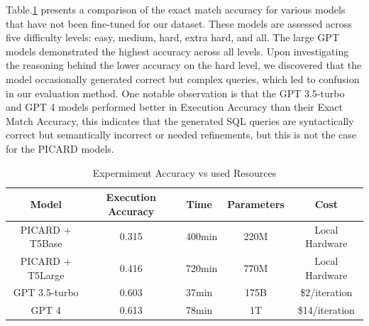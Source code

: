 Table.\ref{tab:exp-acc-vs-resources} presents a comparison of the exact match accuracy for various models that have not been fine-tuned for our dataset. These models are assessed across five difficulty levels: easy, medium, hard, extra hard, and all. The large GPT models demonstrated the highest accuracy across all levels. Upon investigating the reasoning behind the lower accuracy on the hard level, we discovered that the model occasionally generated correct but complex queries, which led to confusion in our evaluation method. One notable observation is that the GPT 3.5-turbo and GPT 4 models performed better in Execution Accuracy than their Exact Match Accuracy, this indicates that the generated SQL queries are syntactically correct but semantically incorrect or needed refinements, but this is not the case for the PICARD models.

\begin{table}[!ht]
    \centering
    \begin{tabular}{ccccc}
        \hline
        Model            & \textbf{Execution Accuracy} & \textbf{Time} & \textbf{Parameters} & \textbf{Cost}  \\ \hline
        PICARD + T5Base  & 0.315                       & ~400min       & 220M                & Local Hardware \\ \hline
        PICARD + T5Large & 0.416                       & ~720min       & 770M                & Local Hardware \\ \hline
        GPT 3.5-turbo    & 0.603                       & 37min         & 175B                & \$2/iteration  \\ \hline
        GPT 4            & 0.613                       & 78min         & 1T                  & \$14/iteration \\ \hline
    \end{tabular}
    \caption{Expermiment Accuracy vs used Resources}
    \label{tab:exp-acc-vs-resources}
\end{table}


